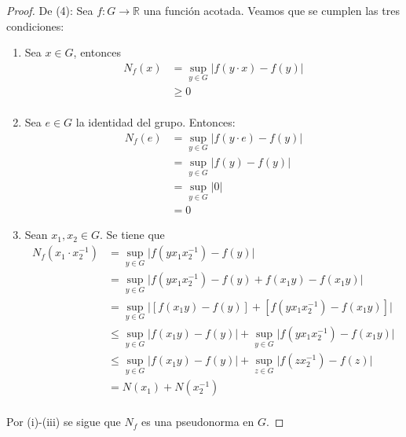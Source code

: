 \documentclass[12pt]{report}
\theoremstyle{largebreak}
\newcommand\abs[1]{\ensuremath{\lvert#1\rvert}}
\newcommand{\cf}[3]{\ensuremath{#1:#2\rightarrow#3}}
\begin{document}
    \begin{proof}
        De (4): Sea $\cf{f}{G}{\mathbb{R}}$ una función acotada. Veamos que se cumplen las tres condiciones:
        \renewcommand{\theenumi}{\roman{enumi}}
        \begin{enumerate}
            \item Sea $x\in G$, entonces
            \begin{equation*}
                \begin{split}
                    N_f(x)&=\sup_{ y\in G}\abs{f(y\cdot x)-f(y)}\\
                    &\geq0\\
                \end{split}
            \end{equation*}
            \item Sea $e\in G$ la identidad del grupo. Entonces:
            \begin{equation*}
                \begin{split}
                    N_f(e)&=\sup_{ y\in G}\abs{f(y\cdot e)-f(y)}\\
                    &=\sup_{ y\in G}\abs{f(y)-f(y)}\\
                    &=\sup_{ y\in G}\abs{0}\\
                    &=0
                \end{split}
            \end{equation*}
            \item Sean $x_1,x_2\in G$. Se tiene que
            \begin{equation*}
                \begin{split}
                    N_f(x_1\cdot x_2^{-1})&=\sup_{ y\in G}\abs{f(y x_1 x_2^{-1})-f(y)}\\
                    &=\sup_{ y\in G}\abs{f(y x_1 x_2^{-1})-f(y)+f(x_1y)-f(x_1y)}\\
                    &=\sup_{ y\in G}\abs{[f(x_1y)-f(y)]+[f(y x_1 x_2^{-1})-f(x_1y)]}\\
                    &\leq\sup_{ y\in G}\abs{f(x_1y)-f(y)}+\sup_{ y\in G}\abs{f(y x_1 x_2^{-1})-f(x_1y)}\\
                    &\leq\sup_{ y\in G}\abs{f(x_1y)-f(y)}+\sup_{ z\in G}\abs{f(zx_2^{-1})-f(z)}\\
                    &= N(x_1)+N(x_2^{-1})\\
                \end{split}
            \end{equation*}
        \end{enumerate}
        Por (i)-(iii) se sigue que $N_f$ es una pseudonorma en $G$.
    \end{proof}
\end{document}
